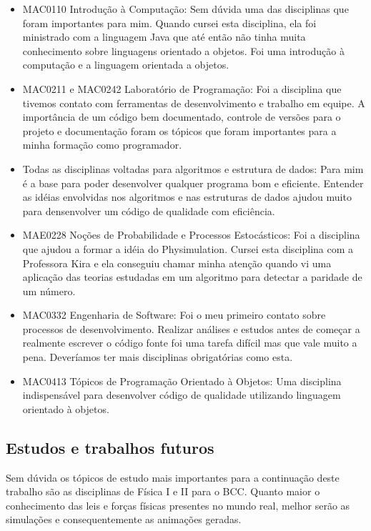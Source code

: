 \begin{itemize}
  \item MAC0110 Introdução à Computação: Sem dúvida uma das disciplinas que foram importantes para mim. Quando cursei esta disciplina, ela foi ministrado com a
    linguagem Java que até então não tinha muita conhecimento sobre linguagens orientado a objetos. Foi uma introdução à computação e a linguagem orientada a 
    objetos.
  \item MAC0211 e MAC0242 Laboratório de Programação: Foi a disciplina que tivemos contato com ferramentas de desenvolvimento e trabalho em equipe. A 
    importância de um código bem documentado, controle de versões para o projeto e documentação foram os tópicos que foram importantes para a minha formação 
    como programador.
  \item Todas as disciplinas voltadas para algoritmos e estrutura de dados: Para mim é a base para poder desenvolver qualquer programa bom e eficiente. Entender 
    as idéias envolvidas nos algoritmos e nas estruturas de dados ajudou muito para densenvolver um código de qualidade com eficiência.
  \item MAE0228 Noções de Probabilidade e Processos Estocásticos: Foi a disciplina que ajudou a formar a idéia do Physimulation. Cursei esta disciplina com a 
    Professora Kira e ela conseguiu chamar minha atenção quando vi uma aplicação das teorias estudadas em um algoritmo para detectar a paridade de um número.
  \item MAC0332 Engenharia de Software: Foi o meu primeiro contato sobre processos de desenvolvimento. Realizar análises e estudos antes de começar a realmente 
    escrever o código fonte foi uma tarefa difícil mas que vale muito a pena. Deveríamos ter mais disciplinas obrigatórias como esta.
  \item MAC0413 Tópicos de Programação Orientado à Objetos: Uma disciplina indispensável para desenvolver código de qualidade utilizando linguagem orientado 
    à objetos.
\end{itemize}

\subsection{Estudos e trabalhos futuros} 
Sem dúvida os tópicos de estudo mais importantes para a continuação deste trabalho são as disciplinas de Física I e II para o BCC. Quanto maior o conhecimento das leis e forças físicas presentes no mundo real, melhor serão as simulações e consequentemente as animações geradas.\\

